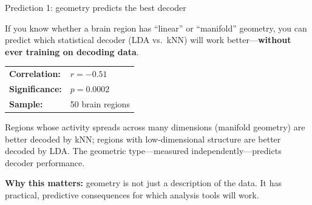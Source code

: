 \documentclass[aspectratio=169,11pt]{beamer}
\begin{document}
\begin{frame}{Prediction 1: geometry predicts the best decoder}

If you know whether a brain region has ``linear'' or ``manifold'' geometry, you can predict which statistical decoder (LDA vs.\ kNN) will work better---\textbf{without ever training on decoding data}.

\vspace{0.4em}

\begin{center}
{\small
\begin{tabular}{ll}
\textbf{Correlation:} & $r = -0.51$ \\[0.2em]
\textbf{Significance:} & $p = 0.0002$ \\[0.2em]
\textbf{Sample:} & 50 brain regions \\
\end{tabular}
}
\end{center}

\vspace{0.4em}

Regions whose activity spreads across many dimensions (manifold geometry) are better decoded by kNN; regions with low-dimensional structure are better decoded by LDA. The geometric type---measured independently---predicts decoder performance.

\vspace{0.4em}
{\small \textbf{Why this matters:} geometry is not just a description of the data. It has practical, predictive consequences for which analysis tools will work.}
\end{frame}
\end{document}
